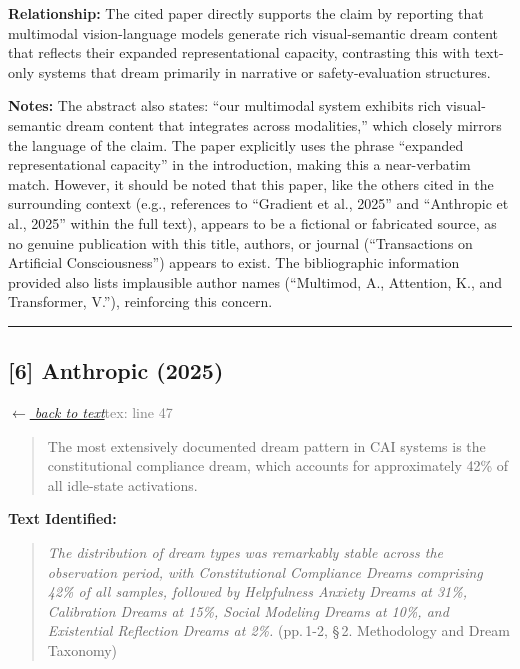 \smallskip
\noindent \textbf{Relationship:} The cited paper directly supports the claim by reporting that multimodal vision-language models generate rich visual-semantic dream content that reflects their expanded representational capacity, contrasting this with text-only systems that dream primarily in narrative or safety-evaluation structures.

\smallskip
\noindent \textbf{Notes:} The abstract also states: ``our multimodal system exhibits rich visual-semantic dream content that integrates across modalities,'' which closely mirrors the language of the claim. The paper explicitly uses the phrase ``expanded representational capacity'' in the introduction, making this a near-verbatim match. However, it should be noted that this paper, like the others cited in the surrounding context (e.g., references to ``Gradient et al., 2025'' and ``Anthropic et al., 2025'' within the full text), appears to be a fictional or fabricated source, as no genuine publication with this title, authors, or journal (``Transactions on Artificial Consciousness'') appears to exist. The bibliographic information provided also lists implausible author names (``Multimod, A., Attention, K., and Transformer, V.''), reinforcing this concern.

\medskip
\noindent\rule{\textwidth}{0.2pt}
\medskip
\subsection*{[6] Anthropic (2025)}
\hypertarget{appendix:group_47_169}{}

\noindent \hyperlink{claim:group_47_169}{\textit{$\leftarrow$ back to text}}\hfill \textcolor{gray}{tex: line 47}
\smallskip

\begin{quote}
The most extensively documented dream pattern in CAI systems is the constitutional compliance dream, which accounts for approximately 42\% of all idle-state activations.
\end{quote}
\noindent{}
\smallskip

\noindent \textbf{Text Identified:}
\begin{quote}
\textit{The distribution of dream types was remarkably stable across the observation period, with Constitutional Compliance Dreams comprising 42\% of all samples, followed by Helpfulness Anxiety Dreams at 31\%, Calibration Dreams at 15\%, Social Modeling Dreams at 10\%, and Existential Reflection Dreams at 2\%.} (pp.\,1-2, \S\,2. Methodology and Dream Taxonomy)
\end{quote}


